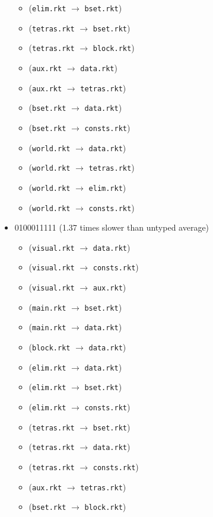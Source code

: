 \documentclass{article}
\newcommand{\mono}[1]{\texttt{#1}}
\begin{document}
\begin{itemize}
\begin{itemize}
  \item (\mono{elim.rkt} $\rightarrow$ \mono{bset.rkt})
  \item (\mono{tetras.rkt} $\rightarrow$ \mono{bset.rkt})
  \item (\mono{tetras.rkt} $\rightarrow$ \mono{block.rkt})
  \item (\mono{aux.rkt} $\rightarrow$ \mono{data.rkt})
  \item (\mono{aux.rkt} $\rightarrow$ \mono{tetras.rkt})
  \item (\mono{bset.rkt} $\rightarrow$ \mono{data.rkt})
  \item (\mono{bset.rkt} $\rightarrow$ \mono{consts.rkt})
  \item (\mono{world.rkt} $\rightarrow$ \mono{data.rkt})
  \item (\mono{world.rkt} $\rightarrow$ \mono{tetras.rkt})
  \item (\mono{world.rkt} $\rightarrow$ \mono{elim.rkt})
  \item (\mono{world.rkt} $\rightarrow$ \mono{consts.rkt})
  \end{itemize}
\item 0100011111 (1.37 times slower than untyped average)
  \begin{itemize}
  \item (\mono{visual.rkt} $\rightarrow$ \mono{data.rkt})
  \item (\mono{visual.rkt} $\rightarrow$ \mono{consts.rkt})
  \item (\mono{visual.rkt} $\rightarrow$ \mono{aux.rkt})
  \item (\mono{main.rkt} $\rightarrow$ \mono{bset.rkt})
  \item (\mono{main.rkt} $\rightarrow$ \mono{data.rkt})
  \item (\mono{block.rkt} $\rightarrow$ \mono{data.rkt})
  \item (\mono{elim.rkt} $\rightarrow$ \mono{data.rkt})
  \item (\mono{elim.rkt} $\rightarrow$ \mono{bset.rkt})
  \item (\mono{elim.rkt} $\rightarrow$ \mono{consts.rkt})
  \item (\mono{tetras.rkt} $\rightarrow$ \mono{bset.rkt})
  \item (\mono{tetras.rkt} $\rightarrow$ \mono{data.rkt})
  \item (\mono{tetras.rkt} $\rightarrow$ \mono{consts.rkt})
  \item (\mono{aux.rkt} $\rightarrow$ \mono{tetras.rkt})
  \item (\mono{bset.rkt} $\rightarrow$ \mono{block.rkt})

\end{itemize}
\end{itemize}
\end{document}
